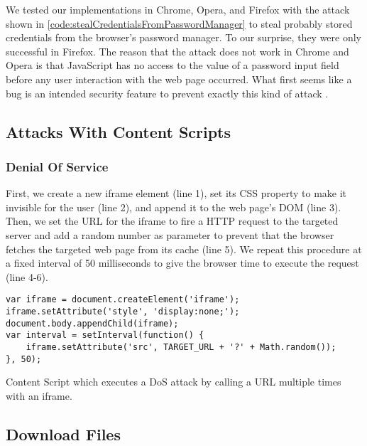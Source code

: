 	We tested our implementations in Chrome, Opera, and Firefox with the attack shown in \autoref{code:stealCredentialsFromPasswordManager} to steal probably stored credentials from the browser's password manager. To our surprise, they were only successful in Firefox. The reason that the attack does not work in Chrome and Opera is that JavaScript has no access to the value of a password input field before any user interaction with the web page occurred. What first seems like a bug is an intended security feature to prevent exactly this kind of attack \cite{chromiumBlogPasswordInput}.



\subsection{Attacks With Content Scripts}

\subsubsection{Denial Of Service}

	First, we create a new iframe element (line 1), set its CSS property to make it invisible for the user (line 2), and append it to the web page's DOM (line 3). Then, we set the URL for the iframe to fire a HTTP request to the targeted server and add a random number as parameter to prevent that the browser fetches the targeted web page from its cache (line 5). We repeat this procedure at a fixed interval of 50 milliseconds to give the browser time to execute the request (line 4-6).

	\begin{code}
		\begin{lstlisting}
var iframe = document.createElement('iframe');
iframe.setAttribute('style', 'display:none;');
document.body.appendChild(iframe);
var interval = setInterval(function() {	
	iframe.setAttribute('src', TARGET_URL + '?' + Math.random());
}, 50);
\end{lstlisting}
		\caption{Content Script which executes a DoS attack by calling a URL multiple times with an iframe.}
		\label{code:DoSWithIframe}
	\end{code}





\subsection{Download Files}



